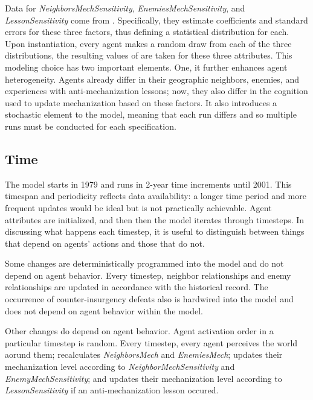 \documentclass{article}
\begin{document}
Data for \textit{NeighborsMechSensitivity}, \textit{EnemiesMechSensitivity}, and
\textit{LessonSensitivity} come from \citet{sechser2010army}. Specifically, they
estimate coefficients and standard errors for these three factors, thus defining
a statistical distribution for each. Upon instantiation, every agent makes a
random draw from each of the three distributions, the resulting values of are
taken for these three attributes. This modeling choice has two important
elements. One, it further enhances agent heterogeneity. Agents already differ in
their geographic neighbors, enemies, and experiences with anti-mechanization
lessons; now, they also differ in the cognition used to update mechanization
based on these factors. It also introduces a stochastic element to the
model, meaning that each run differs and so multiple runs must be conducted for
each specification.

\subsection{Time}

The model starts in 1979 and runs in 2-year time increments until 2001. This
timespan and periodicity reflects data availability: a longer time period and
more frequent updates would be ideal but is not practically achievable. Agent
attributes are initialized, and then then the model iterates through timesteps. 
In discussing what happens each timestep, it is useful to distinguish between
things that depend on agents' actions and those that do not.

Some changes are deterministically programmed into the model and do not depend on
agent behavior. Every timestep, neighbor relationships and enemy relationships
are updated in accordance with the historical record. The occurrence of
counter-insurgency defeats also is hardwired into the model and does not depend
on agent behavior within the model.

Other changes do depend on agent behavior. Agent activation order in a
particular timestep is random. Every timestep, every agent perceives the world
aorund them; recalculates \textit{NeighborsMech} and \textit{EnemiesMech};
updates their mechanization level according to \textit{NeighborMechSensitivity}
and \textit{EnemyMechSensitivity}; and updates their mechanization level
according to \textit{LessonSensitivity} if an anti-mechanization lesson occured.
\end{document}
